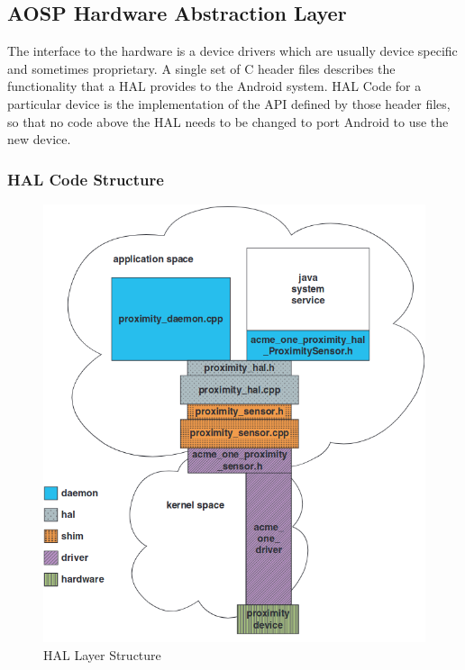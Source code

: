 \subsection{AOSP Hardware Abstraction Layer}
\label{task:20231117_aosp_hal}

The interface to the hardware is a device drivers which are usually device specific and sometimes proprietary. A single set of C header files describes the functionality that a HAL provides to the Android system. HAL Code for a particular device is the implementation of the API defined by those header files, so that no code above the HAL needs to be changed to port Android to use the new device.

\subsubsection*{HAL Code Structure}

\begin{figure}[H]
    \centering
    \includegraphics[width=.75\linewidth]{entries/2023/11/17/hal.png}
    \caption{HAL Layer Structure}
    \label{fig:hallayerstruct}
\end{figure}

